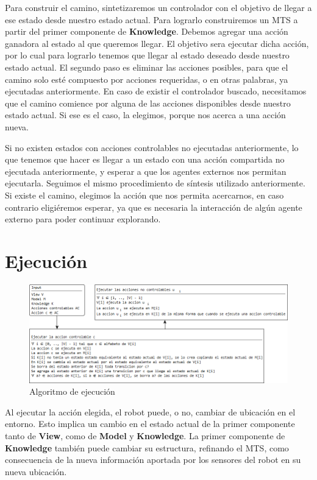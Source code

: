 \vspace{\baselineskip}
Para construir el camino, sintetizaremos un controlador con el objetivo de llegar a ese estado desde nuestro estado actual. Para lograrlo construiremos un MTS
a partir del primer componente de \textbf{Knowledge}. Debemos agregar una acción ganadora al estado al que queremos llegar. El objetivo sera ejecutar dicha acción,
por lo cual para lograrlo tenemos que llegar al estado deseado desde nuestro estado actual. El segundo paso es eliminar las acciones posibles, para que el camino
solo esté compuesto por acciones requeridas, o en otras palabras, ya ejecutadas anteriormente. En caso de existir el controlador buscado, necesitamos que el camino
comience por alguna de las acciones disponibles desde nuestro estado actual. Si ese es el caso, la elegimos, porque nos acerca a una acción nueva.

\vspace{\baselineskip}
Si no existen estados con acciones controlables no ejecutadas anteriormente, lo que tenemos que hacer es llegar a un estado con una acción compartida no ejecutada
anteriormente, y esperar a que los agentes externos nos permitan ejecutarla. Seguimos el mismo procedimiento de síntesis utilizado anteriormente. Si existe el camino,
elegimos la acción que nos permita acercarnos, en caso contrario eligiéremos esperar, ya que es necesaria la interacción de algún agente externo para poder continuar
explorando.

\section{Ejecución}

\begin{figure}[H]
  \centering
    \includegraphics[width=1.0\textwidth]{Imagenes/Algoritmo/Algoritmo_ejecutar.png}
  \caption{Algoritmo de ejecución}
  \label{fig:Algoritmo_ejecutar}
\end{figure}

Al ejecutar la acción elegida, el robot puede, o no, cambiar de ubicación en el entorno. Esto implica un cambio en el estado actual de la primer componente tanto 
de \textbf{View}, como de \textbf{Model} y \textbf{Knowledge}. La primer componente de \textbf{Knowledge} también puede cambiar su estructura, refinando el MTS,
como consecuencia de la nueva información aportada por los sensores del robot en su nueva ubicación.

